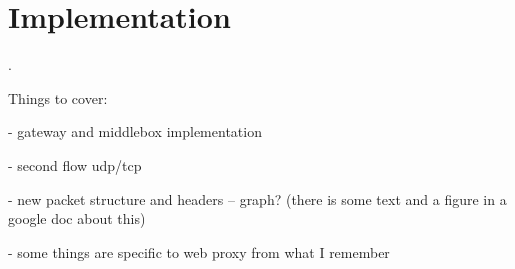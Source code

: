 
\section{Implementation} \label{sec:impl}

.

Things to cover:

- gateway and middlebox implementation

- second flow udp/tcp

- new packet structure and headers -- graph? (there is some text and a figure in a google doc about this)

- some things are specific to web proxy from what I remember

